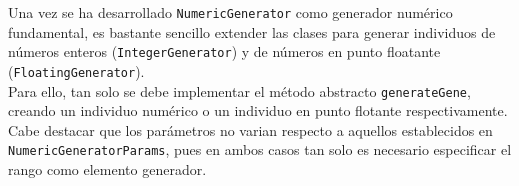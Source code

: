 Una vez se ha desarrollado \texttt{NumericGenerator} como generador numérico fundamental, es bastante sencillo extender las clases para generar individuos de números enteros (\texttt{IntegerGenerator}) y de números en punto floatante (\texttt{FloatingGenerator}). \\

Para ello, tan solo se debe implementar el método abstracto \texttt{generateGene}, creando un individuo numérico o un individuo en punto flotante respectivamente. Cabe destacar que los parámetros no varian respecto a aquellos establecidos en \texttt{NumericGeneratorParams}, pues en ambos casos tan solo es necesario especificar el rango como elemento generador.

